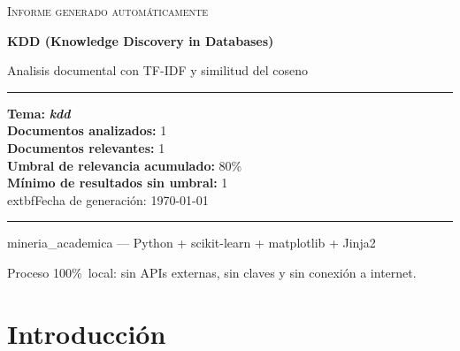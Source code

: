 \documentclass[11pt,a4paper]{article}
\newcommand{\tema}[1]{\textbf{\textit{#1}}}
\newcommand{\pcento}{\%}
\begin{document}
\begin{titlepage}
  \centering
  \vspace*{2.0cm}

  {\Large\textsc{Informe generado automáticamente}\par}
  \vspace{0.7cm}
  {\huge\bfseries KDD (Knowledge Discovery in Databases)\par}
  \vspace{0.4cm}
  {\large Analisis documental con TF-IDF y similitud del coseno\par}

  \vspace{1.8cm}

  \begin{minipage}{0.92\textwidth}
    \hrule
    \vspace{0.4cm}
    {\small
    \textbf{Tema:} \tema{ kdd }\\[4pt]
    \textbf{Documentos analizados:} 1\\
    \textbf{Documentos relevantes:} 1\\
    \textbf{Umbral de relevancia acumulado:} 80\pcento\\
    \textbf{Mínimo de resultados sin umbral:} 1\\
      	extbf{Fecha de generación:} \today
    \par}
    \vspace{0.4cm}
    \hrule
  \end{minipage}

  \vfill

  {\small mineria\_academica --- Python + scikit-learn + matplotlib + Jinja2\par}
  {\footnotesize
   Proceso 100\pcento\ local: sin APIs externas, sin claves y sin conexión
   a internet.\par}
\end{titlepage}

\tableofcontents
\newpage

\section{Introducción}
\label{sec:introduccion}
\end{document}
